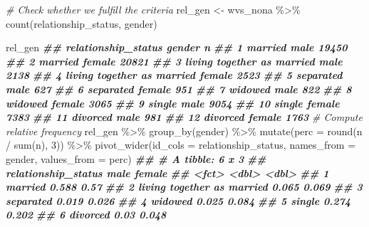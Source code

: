 \documentclass[
]{book}
\newenvironment{Shaded}{\begin{snugshade}}{\end{snugshade}}
\newcommand{\AttributeTok}[1]{\textcolor[rgb]{0.77,0.63,0.00}{#1}}
\newcommand{\CommentTok}[1]{\textcolor[rgb]{0.56,0.35,0.01}{\textit{#1}}}
\newcommand{\DecValTok}[1]{\textcolor[rgb]{0.00,0.00,0.81}{#1}}
\newcommand{\DocumentationTok}[1]{\textcolor[rgb]{0.56,0.35,0.01}{\textbf{\textit{#1}}}}
\newcommand{\FunctionTok}[1]{\textcolor[rgb]{0.00,0.00,0.00}{#1}}
\newcommand{\NormalTok}[1]{#1}
\newcommand{\OtherTok}[1]{\textcolor[rgb]{0.56,0.35,0.01}{#1}}
\newcommand{\SpecialCharTok}[1]{\textcolor[rgb]{0.00,0.00,0.00}{#1}}
\begin{document}
\begin{Shaded}
\begin{Highlighting}[]
\CommentTok{\# Check whether we fulfill the criteria}
\NormalTok{rel\_gen }\OtherTok{\textless{}{-}}\NormalTok{ wvs\_nona }\SpecialCharTok{\%\textgreater{}\%}
  \FunctionTok{count}\NormalTok{(relationship\_status, gender)}

\NormalTok{rel\_gen}
\DocumentationTok{\#\#           relationship\_status gender     n}
\DocumentationTok{\#\# 1                     married   male 19450}
\DocumentationTok{\#\# 2                     married female 20821}
\DocumentationTok{\#\# 3  living together as married   male  2138}
\DocumentationTok{\#\# 4  living together as married female  2523}
\DocumentationTok{\#\# 5                   separated   male   627}
\DocumentationTok{\#\# 6                   separated female   951}
\DocumentationTok{\#\# 7                     widowed   male   822}
\DocumentationTok{\#\# 8                     widowed female  3065}
\DocumentationTok{\#\# 9                      single   male  9054}
\DocumentationTok{\#\# 10                     single female  7383}
\DocumentationTok{\#\# 11                   divorced   male   981}
\DocumentationTok{\#\# 12                   divorced female  1763}
\CommentTok{\# Compute relative frequency}
\NormalTok{rel\_gen }\SpecialCharTok{\%\textgreater{}\%}
  \FunctionTok{group\_by}\NormalTok{(gender) }\SpecialCharTok{\%\textgreater{}\%}
  \FunctionTok{mutate}\NormalTok{(}\AttributeTok{perc =} \FunctionTok{round}\NormalTok{(n }\SpecialCharTok{/} \FunctionTok{sum}\NormalTok{(n), }\DecValTok{3}\NormalTok{)) }\SpecialCharTok{\%\textgreater{}\%}
  \FunctionTok{pivot\_wider}\NormalTok{(}\AttributeTok{id\_cols =}\NormalTok{ relationship\_status,}
              \AttributeTok{names\_from =}\NormalTok{ gender,}
              \AttributeTok{values\_from =}\NormalTok{ perc)}
\DocumentationTok{\#\# \# A tibble: 6 x 3}
\DocumentationTok{\#\#   relationship\_status         male female}
\DocumentationTok{\#\#   \textless{}fct\textgreater{}                      \textless{}dbl\textgreater{}  \textless{}dbl\textgreater{}}
\DocumentationTok{\#\# 1 married                    0.588  0.57 }
\DocumentationTok{\#\# 2 living together as married 0.065  0.069}
\DocumentationTok{\#\# 3 separated                  0.019  0.026}
\DocumentationTok{\#\# 4 widowed                    0.025  0.084}
\DocumentationTok{\#\# 5 single                     0.274  0.202}
\DocumentationTok{\#\# 6 divorced                   0.03   0.048}
\end{Highlighting}
\end{Shaded}
\end{document}
